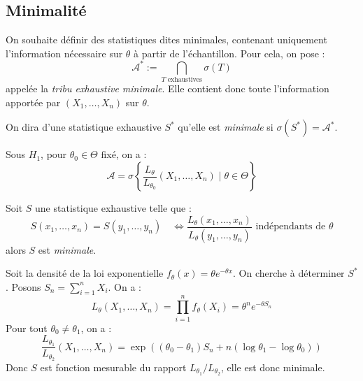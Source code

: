 \subsection{Minimalité}

On souhaite définir des statistiques dites minimales, contenant uniquement l'information nécessaire 
sur $ \theta$ à partir de l'échantillon. Pour cela, on pose : 
    $$ \mathcal{A}^* := \bigcap_{T \text{ exhaustives}} \sigma(T) $$ 
appelée la \emph{tribu exhaustive minimale}. Elle contient donc toute l'information apportée par 
$(X_1, \dots, X_n)$ sur $ \theta$. 

\begin{definition}
    On dira d'une statistique exhaustive $S^*$ qu'elle est \emph{minimale} si $ \sigma(S^*) = \mathcal{A}^*$. 
\end{definition}

\begin{proposition}
    Sous $ H_1$, pour $ \theta_0 \in \Theta$ fixé, on a : 
        $$ 
            \mathcal{A} = \sigma \left\{
                \frac{L_\theta}{L_{\theta_0}} (X_1, \dots, X_n) \mid \theta \in \Theta
            \right\}
        $$
\end{proposition}

\begin{proposition}
    Soit $S$ une statistique exhaustive telle que : 
        \begin{equation}
            S(x_1, \dots, x_n) = S(y_1, \dots, y_n) \quad \iff \frac{L_\theta(x_1, \dots, x_n)}{L_\theta(y_1, \dots, y_n)}
            \text{ indépendants de } \theta
        \end{equation}
    alors $S$ est \emph{minimale}. 
\end{proposition}

\begin{example}
    Soit la densité de la loi exponentielle $ f_\theta(x) = \theta e^{ - \theta x} $. On cherche à déterminer $S^*$. 
    Posons $ S_n = \sum_{i=1}^{n} X_i$. On a : 
        $$ L_\theta(X_1, \dots, X_n) = \prod_{i=1}^{n} f_\theta(X_i) = \theta^n e^{- \theta S_n} $$ 
    Pour tout $ \theta_0 \not = \theta_1$, on a :
        $$ 
            \frac{L_{\theta_1}}{L_{\theta_2}}(X_1, \dots, X_n) = \exp (( \theta_0 - \theta_1) S_n + n(\log \theta_1 - \log \theta_0))
        $$ 
    Donc $S$ est fonction mesurable du rapport $ L_{\theta_1}/L_{\theta_2}$, elle est donc minimale. 
\end{example}



